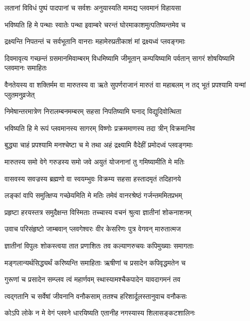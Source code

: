 \twolineshloka
{लतानां विविधं पुष्पं पादपानां च सर्वशः}
{अनुयास्यति मामद्य प्लवमानं विहायसा} %

\twolineshloka
{भविष्यति हि मे पन्थाः स्वातेः पन्था इवाम्बरे}
{चरन्तं घोरमाकाशमुत्पतिष्यन्तमेव च} %

\twolineshloka
{द्रक्ष्यन्ति निपतन्तं च सर्वभूतानि वानराः}
{महामेरुप्रतीकाशं मां द्रक्ष्यध्वं प्लवङ्गमाः} %

\threelineshloka
{दिवमावृत्य गच्छन्तं ग्रसमानमिवाम्बरम्}
{विधमिष्यामि जीमूतान् कम्पयिष्यामि पर्वतान्}
{सागरं शोषयिष्यामि प्लवमानः समाहितः} %

\threelineshloka
{वैनतेयस्य वा शक्तिर्मम वा मारुतस्य वा}
{ऋते सुपर्णराजानं मारुतं वा महाबलम्}
{न तद् भूतं प्रपश्यामि यन्मां प्लुतमनुव्रजेत्} %

\twolineshloka
{निमेषान्तरमात्रेण निरालम्बनमम्बरम्}
{सहसा निपतिष्यामि घनाद् विद्युदिवोत्थिता} %

\twolineshloka
{भविष्यति हि मे रूपं प्लवमानस्य सागरम्}
{विष्णोः प्रक्रममाणस्य तदा त्रीन् विक्रमानिव} %

\twolineshloka
{बुद्ध्या चाहं प्रपश्यामि मनश्चेष्टा च मे तथा}
{अहं द्रक्ष्यामि वैदेहीं प्रमोदध्वं प्लवङ्गमाः} %

\twolineshloka
{मारुतस्य समो वेगे गरुडस्य समो जवे}
{अयुतं योजनानां तु गमिष्यामीति मे मतिः} %

\twolineshloka
{वासवस्य सवज्रस्य ब्रह्मणो वा स्वयम्भुवः}
{विक्रम्य सहसा हस्तादमृतं तदिहानये} %

\twolineshloka
{लङ्कां वापि समुत्क्षिप्य गच्छेयमिति मे मतिः}
{तमेवं वानरश्रेष्ठं गर्जन्तममितप्रभम्} %

\twolineshloka
{प्रहृष्टा हरयस्तत्र समुदैक्षन्त विस्मिताः}
{तच्चास्य वचनं श्रुत्वा ज्ञातीनां शोकनाशनम्} %

\twolineshloka
{उवाच परिसंहृष्टो जाम्बवान् प्लवगेश्वरः}
{वीर केसरिणः पुत्र वेगवन् मारुतात्मज} %

\twolineshloka
{ज्ञातीनां विपुलः शोकस्त्वया तात प्रणाशितः}
{तव कल्याणरुचयः कपिमुख्याः समागताः} %

\twolineshloka
{मङ्गलान्यर्थसिद्ध्यर्थं करिष्यन्ति समाहिताः}
{ऋषीणां च प्रसादेन कपिवृद्धमतेन च} %

\twolineshloka
{गुरूणां च प्रसादेन सम्प्लव त्वं महार्णवम्}
{स्थास्यामश्चैकपादेन यावदागमनं तव} %

\twolineshloka
{त्वद्गतानि च सर्वेषां जीवनानि वनौकसाम्}
{ततश्च हरिशार्दूलस्तानुवाच वनौकसः} %

\twolineshloka
{कोऽपि लोके न मे वेगं प्लवने धारयिष्यति}
{एतानीह नगस्यास्य शिलासङ्कटशालिनः} %

